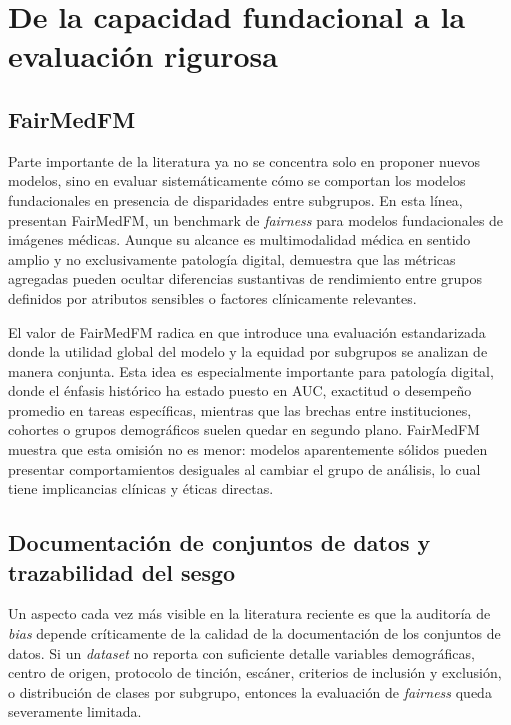 \section{De la capacidad fundacional a la evaluación rigurosa}

\subsection{FairMedFM}

Parte importante de la literatura ya no se concentra solo en proponer nuevos modelos, sino en evaluar sistemáticamente cómo se comportan los modelos fundacionales en presencia de disparidades entre subgrupos. En esta línea, \textcite{NEURIPS2024_c9826b9e} presentan FairMedFM, un benchmark de \textit{fairness} para modelos fundacionales de imágenes médicas. Aunque su alcance es multimodalidad médica en sentido amplio y no exclusivamente patología digital, demuestra que las métricas agregadas pueden ocultar diferencias sustantivas de rendimiento entre grupos definidos por atributos sensibles o factores clínicamente relevantes.

El valor de FairMedFM radica en que introduce una evaluación estandarizada donde la utilidad global del modelo y la equidad por subgrupos se analizan de manera conjunta. Esta idea es especialmente importante para patología digital, donde el énfasis histórico ha estado puesto en AUC, exactitud o desempeño promedio en tareas específicas, mientras que las brechas entre instituciones, cohortes o grupos demográficos suelen quedar en segundo plano. FairMedFM muestra que esta omisión no es menor: modelos aparentemente sólidos pueden presentar comportamientos desiguales al cambiar el grupo de análisis, lo cual tiene implicancias clínicas y éticas directas.

\subsection{Documentación de conjuntos de datos y trazabilidad del sesgo}

Un aspecto cada vez más visible en la literatura reciente es que la auditoría de \textit{bias} depende críticamente de la calidad de la documentación de los conjuntos de datos. Si un \textit{dataset} no reporta con suficiente detalle variables demográficas, centro de origen, protocolo de tinción, escáner, criterios de inclusión y exclusión, o distribución de clases por subgrupo, entonces la evaluación de \textit{fairness} queda severamente limitada.

